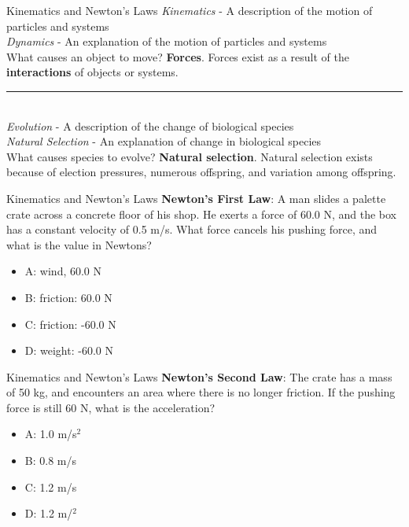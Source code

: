 \documentclass{beamer}
\begin{document}
\begin{frame}{Kinematics and Newton's Laws}
\small
\textit{Kinematics} - A \alert{description} of the motion of particles and systems \\
\textit{Dynamics} - An \alert{explanation} of the motion of particles and systems \\
\vspace{0.25cm}
What causes an object to move?  \textbf{Forces}.  Forces exist as a result of the \alert{\textbf{interactions}} of objects or systems.\\
\vspace{0.25cm}
\rule{10cm}{0.4pt} \\
\vspace{0.25cm}
\textit{Evolution} - A \alert{description} of the change of biological species \\
\textit{Natural Selection} - An \alert{explanation} of change in biological species \\
\vspace{0.25cm}
What causes species to evolve?  \textbf{Natural selection}.  Natural selection exists because of \alert{election pressures}, \alert{numerous offspring}, and \alert{variation} among offspring.
\end{frame}

\begin{frame}{Kinematics and Newton's Laws}
\textbf{Newton's First Law}: A man slides a palette crate across a concrete floor of his shop.  He exerts a force of 60.0 N, and the box has a constant velocity of 0.5 m/s.  What force cancels his pushing force, and what is the value in Newtons?
\begin{itemize}
\item A: wind, 60.0 N
\item B: friction: 60.0 N
\item C: friction: -60.0 N
\item D: weight: -60.0 N
\end{itemize}
\end{frame}

\begin{frame}{Kinematics and Newton's Laws}
\textbf{Newton's Second Law}: The crate has a mass of 50 kg, and encounters an area where there is no longer friction.  If the pushing force is still 60 N, what is the acceleration?
\begin{itemize}
\item A: 1.0 m/s$^2$
\item B: 0.8 m/s
\item C: 1.2 m/s
\item D: 1.2 m/$^2$
\end{itemize}
\end{frame}
\end{document}
